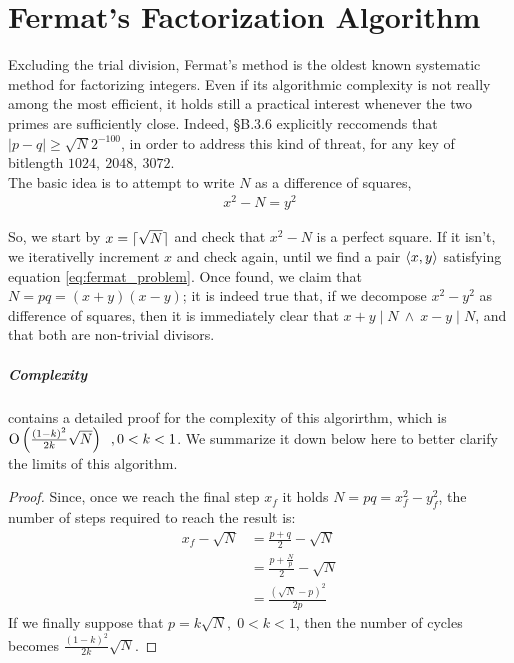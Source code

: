 \chapter{Fermat's Factorization Algorithm \label{chap:fermat}}

Excluding the trial division, Fermat's method is the oldest known systematic
method for factorizing integers. Even if its algorithmic complexity is not
really among the most efficient, it holds still a practical interest whenever
the two primes are sufficiently close.
Indeed, \cite{DSS2009} \S B.3.6 explicitly reccomends that $|p-q| \geq \sqrt{N}2^{-100}$,
in order to address this kind of threat, for any key of bitlength $1024,\ 2048,\ 3072$.\\
The basic idea is to attempt to write $N$ as a difference of squares,
\begin{align}
\label{eq:fermat_problem}
x^2 - N = y^2
\end{align}

So, we start by $x = \lceil\sqrt{N}\rceil$ and check that $x^2-N$ is a perfect
square. If it isn't, we iterativelly increment $x$ and check again, until we
find a pair $\langle x, y\rangle$ satisfying equation \ref{eq:fermat_problem}.
Once found, we claim that $N = pq = (x+y)(x-y)$; it is indeed true that, if we
decompose $x^2 - y^2$ as difference of squares, then it is immediately clear
that $x+y \mid N \ \land \  x-y \mid N$, and that both are non-trivial
divisors.

\paragraph{Complexity} \cite{riesel} contains a detailed proof for the
complexity of this algorirthm, which is
$\operatorname{O}\left(\frac{(1-k)^2}{2k} \sqrt{N}\right) \;\;,  0 < k < 1$. We summarize it down
below here to better clarify the limits of this algorithm.



\begin{proof}
  Since, once we reach the final step $x_f$ it holds $N = pq = x_f^2 - y_f^2$,
  the number of steps required to reach the result is:
  \begin{align*}
    x_f - \sqrt{N} &= \frac{p + q}{2} - \sqrt{N} \\
                   &= \frac{p + \frac{N}{p}}{2} - \sqrt{N} \\
                   &= \frac{(\sqrt{N} - p)^2}{2p}
  \end{align*}
  If we finally suppose that $p = k\sqrt{N}, \; 0 < k < 1$, then the number of cycles
  becomes
  $\frac{(1-k)^2}{2k} \sqrt{N}$.
\end{proof}

